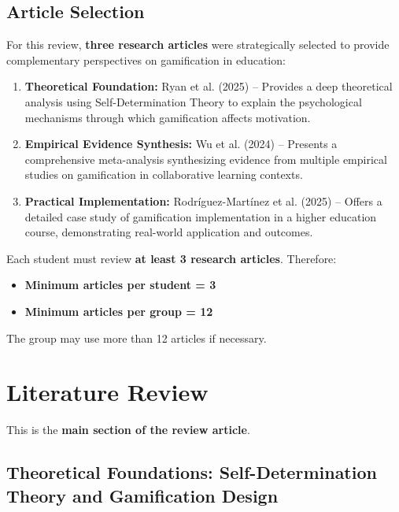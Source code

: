 \documentclass[12pt,a4paper]{article}
\begin{document}
\subsection{Article Selection}

For this review, \textbf{three research articles} were strategically selected to provide complementary perspectives on gamification in education:

\begin{enumerate}
    \item \textbf{Theoretical Foundation:} Ryan et al. (2025) -- Provides a deep theoretical analysis using Self-Determination Theory to explain the psychological mechanisms through which gamification affects motivation.
    
    \item \textbf{Empirical Evidence Synthesis:} Wu et al. (2024) -- Presents a comprehensive meta-analysis synthesizing evidence from multiple empirical studies on gamification in collaborative learning contexts.
    
    \item \textbf{Practical Implementation:} Rodríguez-Martínez et al. (2025) -- Offers a detailed case study of gamification implementation in a higher education course, demonstrating real-world application and outcomes.
\end{enumerate}

Each student must review \textbf{at least 3 research articles}. Therefore:

\begin{itemize}
    \item \textbf{Minimum articles per student = 3}
    \item \textbf{Minimum articles per group = 12}
\end{itemize}

The group may use more than 12 articles if necessary.





\section{Literature Review}

This is the \textbf{main section of the review article}.


\subsection{Theoretical Foundations: Self-Determination Theory and Gamification Design}
\end{document}

